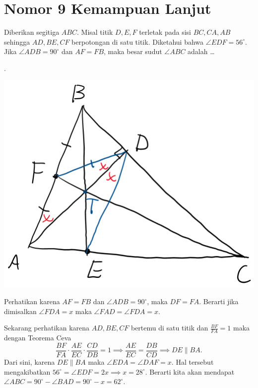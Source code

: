 \documentclass[12pt]{scrartcl}
\begin{document}
\section{Nomor 9 Kemampuan Lanjut}
Diberikan segitiga $ABC$. Misal titik $D,E,F$ terletak pada sisi $BC,CA,AB$ sehingga $AD,BE,CF$ berpotongan di satu titik. Diketahui bahwa $\angle EDF = 56^\circ$. Jika $\angle ADB = 90^\circ$ dan $AF=FB$, maka besar sudut $\angle ABC$ adalah \dots
\begin{solusi}.
\begin{center}
\includegraphics[scale=0.5]{9KL}
\end{center}

 Perhatikan karena $AF=FB$ dan $\angle ADB = 90^\circ$, maka $DF=FA$. Berarti jika dimisalkan $\angle FDA = x$ maka $\angle FAD = \angle FDA = x$. 

Sekarang perhatikan karena $AD,BE,CF$ bertemu di satu titik dan $\frac{BF}{FA}=1$ maka dengan Teorema Ceva
$$\frac{BF}{FA}\cdot \frac{AE}{EC} \cdot \frac{CD}{DB} = 1 \implies \frac{AE}{EC} = \frac{DB}{CD} \implies DE \parallel BA.$$
Dari sini, karena $DE \parallel BA$ maka $\angle EDA = \angle DAF = x$. Hal tersebut mengakibatkan $56^\circ =\angle EDF = 2x \implies x = 28^\circ$. Berarti kita akan mendapat $\angle ABC = 90^\circ - \angle BAD = 90^\circ - x = \boxed{62^\circ}.$
\end{solusi}
\end{document}
